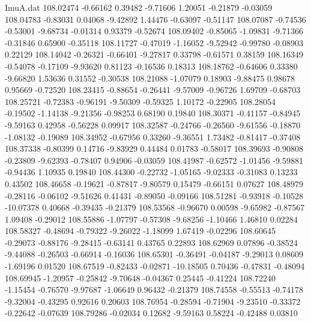 \begin{filecontents}{ImuA.dat}
 108.02474   -0.66162    0.39482   -9.71606    1.20051   -0.21879   -0.03059
 108.04783   -0.83031    0.04068   -9.42892    1.44476   -0.63097   -0.51147
 108.07087   -0.74536   -0.53001   -9.68734   -0.01314    0.93379   -0.52674
 108.09402   -0.85065   -1.09831   -9.71366   -0.31846    0.65900   -0.35118
 108.11727   -0.47019   -1.16052   -9.52942   -0.99780   -0.08903    0.22129
 108.14042   -0.26321   -0.66401   -9.27817    0.33798   -0.61571    0.38159
 108.16349   -0.54078   -0.17109   -9.93620    0.81123   -0.16536    0.18313
 108.18762   -0.64606    0.33380   -9.66820    1.53636    0.31552   -0.30538
 108.21088   -1.07079    0.18903   -9.88475    0.98678    0.95669   -0.72520
 108.23415   -0.88654   -0.26441   -9.57009   -0.96726    1.69709   -0.68703
 108.25721   -0.72383   -0.96191   -9.50309   -0.59325    1.10172   -0.22905
 108.28054   -0.19502   -1.14138   -9.21356   -0.98253    0.68190    0.19840
 108.30371   -0.41157   -0.84945   -9.59163    0.42958   -0.56228    0.09917
 108.32587   -0.24766   -0.26560   -9.61556   -0.18870   -1.08132   -0.19089
 108.34952   -0.67956    0.33260   -9.36551    1.73482   -0.81417   -0.37408
 108.37338   -0.80399    0.14716   -9.83929    0.44484    0.01783   -0.58017
 108.39693   -0.90808   -0.23809   -9.62393   -0.78407    0.94906   -0.03059
 108.41987   -0.62572   -1.01456   -9.59881   -0.94436    1.10935    0.19840
 108.44300   -0.22732   -1.05165   -9.02333   -0.31083    0.13233    0.43502
 108.46658   -0.19621   -0.87817   -9.80579    0.15479   -0.66151    0.07627
 108.48979   -0.28116   -0.06102   -9.51626    0.41431   -0.89050   -0.09166
 108.51281   -0.93918   -0.10528  -10.07378    0.40668   -0.39435   -0.21379
 108.53568   -0.96670    0.00598   -9.65982   -0.87567    1.09408   -0.29012
 108.55886   -1.07797   -0.57308   -9.68256   -1.10466    1.46810    0.02284
 108.58327   -0.48694   -0.79322   -9.26022   -1.18099    1.67419   -0.02296
 108.60645   -0.29073   -0.88176   -9.28415   -0.63141    0.43765    0.22893
 108.62969    0.07896   -0.38524   -9.44088   -0.26503   -0.66914   -0.16036
 108.65301   -0.36491   -0.04187   -9.29013    0.08609   -1.69196    0.01520
 108.67519   -0.82433   -0.02871  -10.18505    0.70436   -0.47831   -0.48094
 108.69945   -1.20957   -0.25842   -9.70648   -0.04367    0.25445   -0.41224
 108.72240   -1.15454   -0.76570   -9.97687   -1.06649    0.96432   -0.21379
 108.74558   -0.55513   -0.74178   -9.32004   -0.43295    0.92616    0.20603
 108.76954   -0.28594   -0.71904   -9.23510   -0.33372   -0.22642   -0.07639
 108.79286   -0.02034    0.12682   -9.59163    0.58224   -0.42488    0.03810

\end{filecontents}
